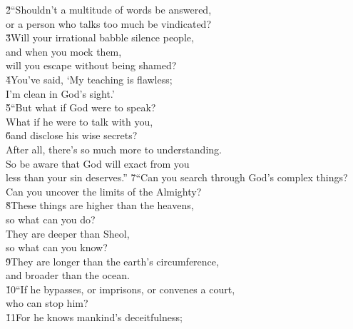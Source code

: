\begin{poetry}
\poeml \v{2}``Shouldn't a multitude of words be answered, \\
\poemll    or a person who talks too much be vindicated? \\
\poeml \v{3}Will your irrational babble silence people, \\
\poemll    and when you mock them, \\
\poemlll       will you escape without being shamed? \\
\poeml \v{4}You've said, `My teaching is flawless; \\
\poemll    I'm clean in God's sight.' \\
\poeml \v{5}``But what if God were to speak? \\
\poemll    What if he were to talk with you, \\
\poeml \v{6}and disclose his wise secrets? \\
\poeml After all, there's so much more to understanding. \\
\poemll    So be aware that God will exact from you \\
\poemlll       less than your sin deserves.''
\poeml \v{7}``Can you search through God's complex things? \\
\poemll    Can you uncover the limits of the Almighty? \\
\poeml \v{8}These things are higher than the heavens, \\
\poemll    so what can you do? \\
\poeml They are deeper than Sheol, \\
\poemll    so what can you know? \\
\poeml \v{9}They are longer than the earth's circumference, \\
\poemll    and broader than the ocean. \\
\poeml \v{10}``If he bypasses, or imprisons, or convenes a court, \\
\poemll    who can stop him? \\
\poeml \v{11}For he knows mankind's deceitfulness; \\

\end{poetry}
